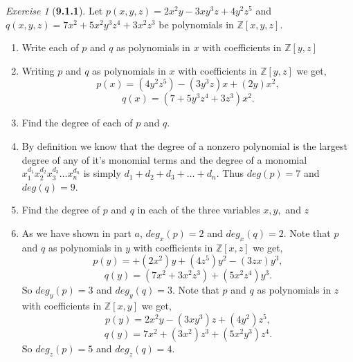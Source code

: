 \documentclass[12pt]{amsart}
\makeatletter
\theoremstyle{remark}
\newtheorem*{exercise}{Exercise}%
\def\ZZ{\ensuremath{\mathbb Z}}
\renewenvironment{proof}[1][\proofname]{\par\doublespacing
  \pushQED{\qed}%
  \normalfont \topsep6\p@\@plus6\p@\relax
  \list{}{%
    \settowidth{\leftmargin}{\itshape\proofname:\hskip\labelsep}%
    \setlength{\labelwidth}{0pt}%
    \setlength{\itemindent}{-\leftmargin}%
  }%
  \item[\hskip\labelsep\itshape#1\@addpunct{:}]\ignorespaces
}{%
  \popQED\endlist\@endpefalse
  \singlespacing
}
\theoremstyle{mycomment}
\makeatother
\begin{document}
\begin{exercise}[\textbf{9.1.1}] Let $p(x, y, z) = 2x^2y - 3xy^3z + 4y^2z^5$ and $q(x, y, z) = 7x^2 + 5x^2y^3z^4 + 3x^2z^3$ be polynomials 
  in $\ZZ[x, y, z]$.
  \begin{enumerate}
    \item[(a)] Write each of $p$ and $q$ as polynomials in $x$ with coefficients in $\ZZ[y, z]$
    \begin{proof} Writing $p$ and $q$ as polynomials in $x$ with coefficients in $\ZZ[y, z]$ we get, 
      \begin{equation*}
        p(x) = (4y^2z^5) - (3y^3z)x + (2y)x^2,
      \end{equation*}
      \begin{equation*}
        q(x) = (7 + 5y^3z^4 + 3z^3)x^2.
      \end{equation*}
    \end{proof}
\vspace{.15in}
      \item[(b)] Find the degree of each of $p$ and $q$.
      \begin{proof} By definition we know that the degree of a nonzero polynomial is the largest degree of any of it's monomial terms and the 
        degree of a monomial $x_1^{d_1}x_2^{d_2}x_3^{d_3}\dots x_n^{d_n}$ is simply $d_1 + d_2 + d_3 + \dots + d_n$. Thus $deg(p) = 7$ and $deg(q) = 9$.
      \end{proof}
\vspace{.15in}

      \item[(c)] Find the degree of $p$ and $q$ in each of the three variables $x, y,$ and $z$
      \begin{proof} As we have shown in part $a$, $deg_x(p) = 2$ and $deg_x(q) = 2$. Note that $p$ and $q$ as 
        polynomials in $y$ with coefficients in $\ZZ[x, z]$ we get, 
        \begin{equation*}
          p(y) = + (2x^2)y + (4z^5)y^2 - (3zx)y^3,
        \end{equation*}
        \begin{equation*}
          q(y) = (7x^2 + 3x^2z^3) + (5x^2z^4)y^3.
        \end{equation*}
        So $deg_y(p) = 3$ and $deg_y(q) = 3$. Note that $p$ and $q$ as 
        polynomials in $z$ with coefficients in $\ZZ[x, y]$ we get, 
        \begin{equation*}
          p(y) = 2x^2y - (3xy^3)z + (4y^2)z^5,
        \end{equation*}
        \begin{equation*}
          q(y) = 7x^2 + (3x^2)z^3 + (5x^2y^3)z^4.
        \end{equation*}
        So $deg_z(p) = 5$ and $deg_z(q) = 4$.
      \end{proof}
      \vspace{.15in}


\end{enumerate}
\end{exercise}
\end{document}
